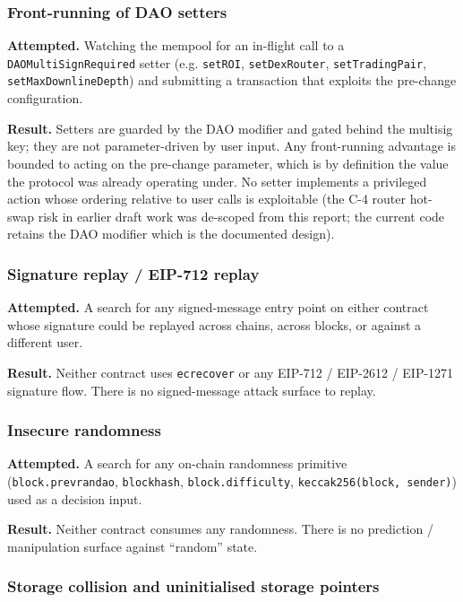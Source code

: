 \documentclass[11pt,a4paper]{article}
\begin{document}
\subsubsection*{Front-running of DAO setters}

\textbf{Attempted.} Watching the mempool for an in-flight call to a
\texttt{DAOMultiSignRequired} setter (e.g. \texttt{setROI},
\texttt{setDexRouter}, \texttt{setTradingPair},
\texttt{setMaxDownlineDepth}) and submitting a transaction that exploits
the pre-change configuration.

\textbf{Result.} Setters are guarded by the DAO modifier and gated behind
the multisig key; they are not parameter-driven by user input. Any
front-running advantage is bounded to acting on the pre-change parameter,
which is by definition the value the protocol was already operating under.
No setter implements a privileged action whose ordering relative to user
calls is exploitable (the C-4 router hot-swap risk in earlier draft work
was de-scoped from this report; the current code retains the DAO modifier
which is the documented design).

\subsubsection*{Signature replay / EIP-712 replay}

\textbf{Attempted.} A search for any signed-message entry point on either
contract whose signature could be replayed across chains, across blocks,
or against a different user.

\textbf{Result.} Neither contract uses \texttt{ecrecover} or any
EIP-712 / EIP-2612 / EIP-1271 signature flow. There is no signed-message
attack surface to replay.

\subsubsection*{Insecure randomness}

\textbf{Attempted.} A search for any on-chain randomness primitive
(\texttt{block.prevrandao}, \texttt{blockhash}, \texttt{block.difficulty},
\texttt{keccak256(block, sender)}) used as a decision input.

\textbf{Result.} Neither contract consumes any randomness. There is no
prediction / manipulation surface against ``random'' state.

\subsubsection*{Storage collision and uninitialised storage pointers}
\end{document}
